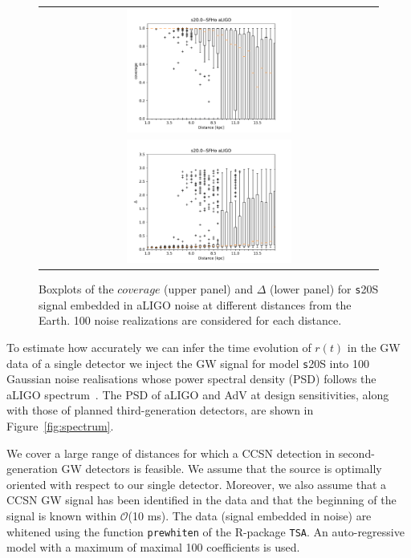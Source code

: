 \begin{figure}[t]
  \centering
  \begin{tabular}{c}
    \includegraphics[width=0.5\textwidth]{plots/s20--SFHo_covpbb_boxplot_aLIGO} \\
    \includegraphics[width=0.5\textwidth]{plots/s20--SFHo_error_boxplot_aLIGO} \\
  \end{tabular}
    
 \caption{Boxplots of the $coverage$ (upper panel) and $\Delta$ (lower panel) for {\texttt s20S} signal embedded in aLIGO noise at different distances from the Earth. 100 noise realizations are considered for each distance. }
  \label{fig:s20results}
\end{figure}

To estimate how accurately we can infer the time evolution of $r(t)$ in the GW data of a single
detector we inject the GW signal for model {\texttt s20S} into 
100 Gaussian noise realisations whose power spectral density (PSD) follows the aLIGO
spectrum~\cite{aLIGOsens:2018}. The PSD of aLIGO and AdV at design sensitivities, along with those of planned third-generation detectors, are shown in Figure~\ref{fig:spectrum}. 

We cover a large range of distances for which a CCSN detection in second-generation GW detectors is feasible. We assume that the source is optimally oriented with respect to our single detector. Moreover, we also assume that a CCSN GW signal has been identified in the data and that the beginning of the signal is known within {$\mathcal O$}(10 ms). The data (signal embedded in noise) are whitened using the function {\tt prewhiten} of the R-package {\tt TSA}. An auto-regressive model with a maximum of maximal 100 coefficients is used.    

